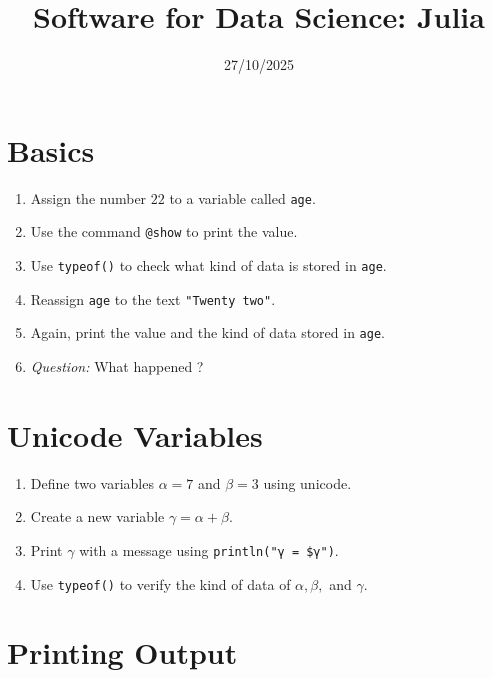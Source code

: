 \documentclass{article}
\title{Software for Data Science: Julia}
\date{27/10/2025}
\begin{document}
\maketitle

\section*{Basics}

\begin{enumerate}
    \item Assign the number \(22\) to a variable called \texttt{age}.
    
    \item Use the command \texttt{@show} to print the value. 

    \item Use \texttt{typeof()} to check what kind of data is stored in \texttt{age}.

    \item Reassign \texttt{age} to the text \texttt{"Twenty two"}.
    
    \item Again, print the value and the kind of data stored in \texttt{age}.
    
    \item \textit{Question:} What happened ?
\end{enumerate}

\section*{Unicode Variables}

\begin{enumerate}
    \item Define two variables \(\alpha = 7\) and \(\beta = 3\) using unicode.
    
    \item Create a new variable \(\gamma = \alpha + \beta\).
    
    \item Print \(\gamma\) with a message using \texttt{println("γ = \$γ")}.
    
    \item Use \texttt{typeof()} to verify the kind of data of \(\alpha, \beta,\) and \(\gamma\).
\end{enumerate}

\section*{Printing Output}
\end{document}
